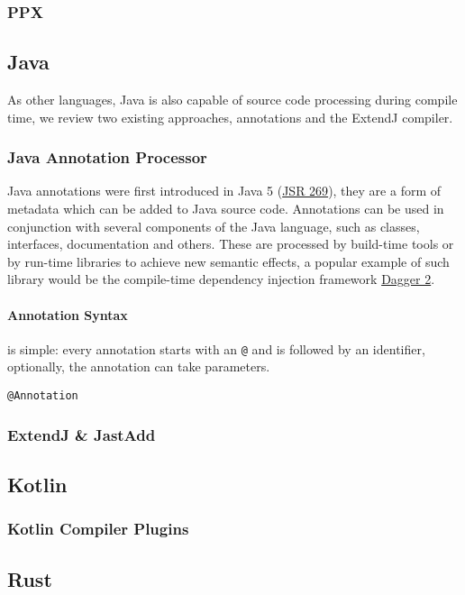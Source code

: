 \subsubsection*{PPX}\label{sec:lang-preprocessors:ocaml:ppx}

\subsection{Java}\label{sec:lang-preprocessors:java}

As other languages, Java is also capable of source code processing during compile time,
we review two existing approaches, annotations and the ExtendJ compiler.

\subsubsection*{Java Annotation Processor}\label{sec:lang-preprocessors:java:annotation}

Java annotations were first introduced in Java 5 (\href{https://jcp.org/en/jsr/detail?id=269}{JSR 269}),
they are a form of metadata which can be added to Java source code.
Annotations can be used in conjunction with several components of the Java language,
such as classes, interfaces, documentation and others.
These are processed by build-time tools or by run-time libraries to achieve new semantic effects,
a popular example of such library would be the compile-time dependency injection framework \href{https://dagger.dev/}{Dagger 2}.

\paragraph{Annotation Syntax} is simple: every annotation starts with an \texttt{@} and is followed by an identifier, optionally, the annotation can take parameters.

\begin{lstlisting}
@Annotation
\end{lstlisting}

\subsubsection*{ExtendJ \& JastAdd}\label{sec:lang-preprocessors:java:extendj}

\subsection{Kotlin}\label{sec:lang-preprocessors:kotlin}

\subsubsection*{Kotlin Compiler Plugins}\label{sec:lang-preprocessors:kotlin:annotation}

\subsection{Rust}\label{sec:lang-preprocessors:rust}
